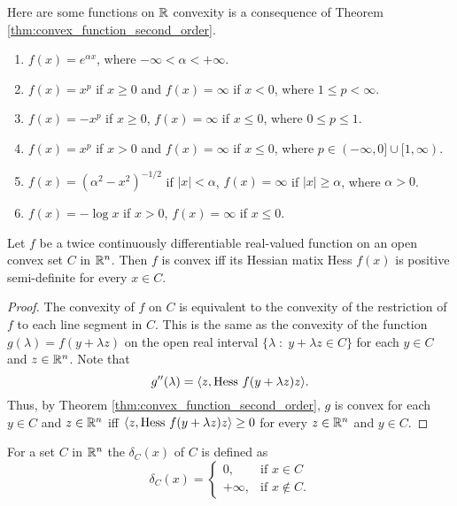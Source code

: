 \documentclass[11pt,a4paper]{article}
\begin{document}
\begin{example}\label{ex:convex_functions}
    Here are some functions on $\mathbb{R}$ convexity is a consequence of Theorem \ref{thm:convex_function_second_order}.
    \begin{enumerate}
        \item $f(x) = e^{\alpha x}$, where $-\infty < \alpha < +\infty$.
        \item $f(x) = x^p$ if $x\ge 0$ and $f(x) = \infty$ if $x<0$, where $1\le p< \infty$.
        \item $f(x) = -x^p$ if $x\ge 0$, $f(x) = \infty$ if $x\le 0$, where $0\le p\le 1$.
        \item $f(x) = x^p$ if $x> 0$ and $f(x) = \infty$ if $x\le 0$, where $p\in (-\infty,0]\cup [1,\infty)$.
        \item $f(x) = (\alpha^2-x^2)^{-1/2}$ if $|x|<\alpha$, $f(x) = \infty$ if $|x|\ge\alpha$, where $\alpha>0$.
        \item $f(x) = -\log{x}$ if $x>0$, $f(x) = \infty$ if $x\le 0$.
    \end{enumerate}
\end{example}

\begin{theorem}
    Let $f$ be a twice continuously differentiable real-valued function on an open convex set $C$ in $\mathbb{R}^n$. Then $f$ is convex iff its Hessian matix Hess $f(x)$ is positive semi-definite for every $x\in C$.
\end{theorem}

\begin{proof}
    The convexity of $f$ on $C$ is equivalent to the convexity of the restriction of $f$ to each line segment in $C$. This is the same as the convexity of the function $g(\lambda) = f(y+\lambda z)$ on the open real interval $\{\lambda\;:\;y+\lambda z\in C\}$ for each $y\in C$ and $z\in \mathbb{R}^n$. Note that 
    \begin{equation*}
        g^{\prime\prime}(\lambda) = \langle z, \text{Hess}\ f(y+\lambda z)z \rangle.
    \end{equation*}
    Thus, by Theorem \ref{thm:convex_function_second_order}, $g$ is convex for each $y\in C$ and $z\in \mathbb{R}^n$ iff $\langle z, \text{Hess}\ f(y+\lambda z)z \rangle\ge 0$ for every $z\in \mathbb{R}^n$ and $y\in C$.
\end{proof}

\begin{definition}
    For a set $C$ in $\mathbb{R}^n$ the  $\delta_C(x)$ of $C$ is defined as 
    \begin{equation*}
        \delta_C(x) = 
        \begin{cases}
			0, & \text{if }x\in C\\
            +\infty, & \text{if } x\notin C.
        \end{cases}
    \end{equation*}
\end{definition}
\end{document}
